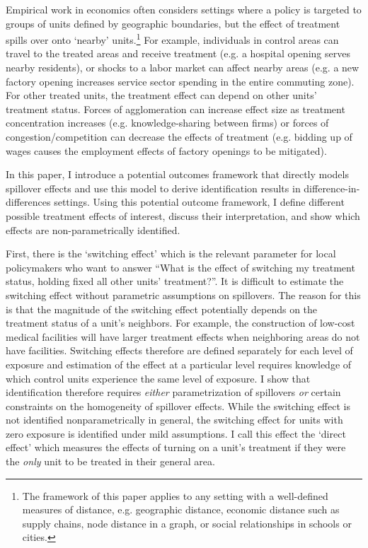 \documentclass[11pt]{article}
\begin{document}
Empirical work in economics often considers settings where a policy is targeted to groups of units defined by geographic boundaries, but the effect of treatment spills over onto `nearby' units.\footnote{The framework of this paper applies to any setting with a well-defined measures of distance, e.g. geographic distance, economic distance such as supply chains, node distance in a graph, or social relationships in schools or cities.} For example, individuals in control areas can travel to the treated areas and receive treatment (e.g. a hospital opening serves nearby residents), or shocks to a labor market can affect nearby areas (e.g. a new factory opening increases service sector spending in the entire commuting zone). For other treated units, the treatment effect can depend on other units' treatment status. Forces of agglomeration can increase effect size as treatment concentration increases (e.g. knowledge-sharing between firms) or forces of congestion/competition can decrease the effects of treatment (e.g. bidding up of wages causes the employment effects of factory openings to be mitigated). 

In this paper, I introduce a potential outcomes framework that directly models spillover effects and use this model to derive identification results in difference-in-differences settings. Using this potential outcome framework, I define different possible treatment effects of interest, discuss their interpretation, and show which effects are non-parametrically identified. 

First, there is the `switching effect' which is the relevant parameter for local policymakers who want to answer ``What is the effect of switching my treatment status, holding fixed all other units' treatment?''. It is difficult to estimate the switching effect without parametric assumptions on spillovers. The reason for this is that the magnitude of the switching effect potentially depends on the treatment status of a unit's neighbors. For example, the construction of low-cost medical facilities will have larger treatment effects when neighboring areas do not have facilities. Switching effects therefore are defined separately for each level of exposure and estimation of the effect at a particular level requires knowledge of which control units experience the same level of exposure. I show that identification therefore requires \emph{either} parametrization of spillovers \emph{or} certain constraints on the homogeneity of spillover effects. While the switching effect is not identified nonparametrically in general, the switching effect for units with zero exposure is identified under mild assumptions. I call this effect the `direct effect' which measures the effects of turning on a unit's treatment if they were the \emph{only} unit to be treated in their general area. 
\end{document}
